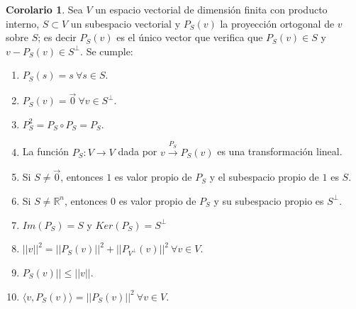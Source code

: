 \documentclass[10pt]{article}
\theoremstyle{definition}
\newtheorem{corollary}{Corolario}[theorem]
\begin{document}
\begin{corollary}
    Sea $V$ un espacio vectorial de dimensión finita con producto interno, $S\subset V$ un subespacio vectorial y $P_S(v)$ la proyección ortogonal de $v$ sobre $S$; es decir $P_S(v)$ es el único vector que verifica que $P_S(v)\in S$ y $v-P_S(v)\in S^\bot$. Se cumple:
    \begin{enumerate}
        \item $P_S(s)=s\ \forall s\in S$.
        \item $P_S(v)=\vec{0}\ \forall v\in S^\bot$.
        \item $P_S^2=P_S\circ P_S=P_S$.
        \item La función $P_S:V\to V$ dada por $v\xrightarrow{P_{S}} P_{S}( v)$ es una transformación lineal.
        \item Si $S\neq \vec{0}$, entonces $1$ es valor propio de $P_S$ y el subespacio propio de $1$ es $S$.
        \item Si $S\neq\mathbb{R}^n$, entonces $0$ es valor propio de $P_S$ y su subespacio propio es $S^\bot$.
        \item $Im(P_S)=S$ y $Ker(P_S)=S^\bot$
        \item $||v||^2=||P_S(v)||^2+||P_{V^\bot}(v)||^2\ \forall v\in V$.
        \item $P_S(v)||\le ||v||$.
        \item $\langle v,P_S(v)\rangle = ||P_S(v)||^2\ \forall v\in V$.
    \end{enumerate}
\end{corollary}
\end{document}
